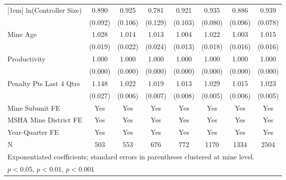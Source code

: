 {\begin{tabular}{l*{7}{c}}
[1em]
ln(Controller Size)      &       0.890         &       0.925         &       0.781         &       0.921         &       0.935         &       0.886         &       0.939         \\
                         &     (0.092)         &     (0.106)         &     (0.129)         &     (0.103)         &     (0.080)         &     (0.096)         &     (0.078)         \\
[1em]
Mine Age                 &       1.028         &       1.014         &       1.013         &       1.004         &       1.022         &       1.003         &       1.015         \\
                         &     (0.019)         &     (0.022)         &     (0.024)         &     (0.013)         &     (0.018)         &     (0.016)         &     (0.016)         \\
[1em]
Productivity             &       1.000         &       1.000         &       1.000         &       1.000         &       1.000         &       1.000         &       1.000         \\
                         &     (0.000)         &     (0.000)         &     (0.000)         &     (0.000)         &     (0.000)         &     (0.000)         &     (0.000)         \\
[1em]
Penalty Pts Last 4 Qtrs  &       1.148\sym{***}&       1.022\sym{***}&       1.019\sym{**} &       1.013         &       1.029\sym{***}&       1.015\sym{*}  &       1.023\sym{***}\\
                         &     (0.027)         &     (0.006)         &     (0.007)         &     (0.008)         &     (0.005)         &     (0.006)         &     (0.005)         \\
[1em]
Mine Subunit FE          &         Yes         &         Yes         &         Yes         &         Yes         &         Yes         &         Yes         &         Yes         \\
[1em]
MSHA Mine District FE    &         Yes         &         Yes         &         Yes         &         Yes         &         Yes         &         Yes         &         Yes         \\
[1em]
Year-Quarter FE          &         Yes         &         Yes         &         Yes         &         Yes         &         Yes         &         Yes         &         Yes         \\
\hline
N                        &         503         &         553         &         676         &         772         &        1170         &        1334         &        2504         \\
\hline\hline
\multicolumn{8}{l}{\footnotesize Exponentiated coefficients; standard errors in parentheses clustered at mine level.}\\
\multicolumn{8}{l}{\footnotesize \sym{*} \(p<0.05\), \sym{**} \(p<0.01\), \sym{***} \(p<0.001\)}\\
\end{tabular}
}
